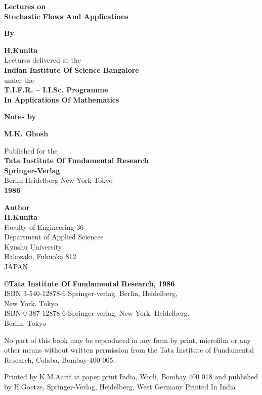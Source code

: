 \thispagestyle{empty}
\begin{center}
  {\Large\bf Lectures on}\\[5pt]
  {\Large\bf Stochastic Flows And Applications}
  \vskip 1cm

  {\bf By}
  \medskip

  {\large\bf H.Kunita}\\[10pt]
  Lectures delivered at the \\
  {\bf Indian Institute Of Science Bangalore}\\
  under the \\
  {\bf T.I.F.R. -- I.I.Sc. Programme}\\ 
  {\bf In Applications Of  Mathematics}
\vfill


{\bf   Notes by}
\medskip

{\large\bf M.K. Ghosh}
\vfill


  Published for the\\
  \textbf{Tata Institute Of Fundamental Research}\\
  {\bf Springer-Verlag}\\
  Berlin Heidelberg New York Tokyo\\
  {\bf 1986}
\end{center}
\eject

\thispagestyle{empty}
\begin{center}
  {\bf Author}\\
  {\large\bf H.Kunita}\\
  Faculty of Engineering 36\\
  Department of Applied Sciences\\
  Kyushu University\\
  Hakozaki, Fukuoka 812\\
  JAPAN  
\end{center}
\vfill

\begin{center}
  \copyright \textbf{Tata Institute Of Fundamental Research, 1986}\\[20pt]
  ISBN 3-540-12878-6 Springer-verlag, Berlin, Heidelberg,\\ New
  York. Tokyo\\
  ISBN 0-387-12878-6 Springer-verlag, New  York. Heidelberg.\\ Berlin. Tokyo
\end{center}
\vfill

\begin{center}
\parbox{0.9\textwidth}{%
  No part of this book may be reproduced in any form by print,
  microfilm or any other means without written permission from the
  Tata Institute of Fundamental Research, Colaba, Bombay-400 005.}
\vfill

\parbox{0.9\textwidth}{Printed by K.M.Aarif at paper print India, Worli, 
  Bombay 400 018 and published by H.Goetze,
  Springer-Verlag, Heidelberg, West Germany
  Printed In India}
\end{center}

